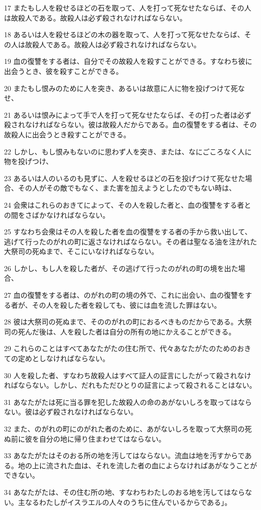 \par 17 またもし人を殺せるほどの石を取って、人を打って死なせたならば、その人は故殺人である。故殺人は必ず殺されなければならない。
\par 18 あるいは人を殺せるほどの木の器を取って、人を打って死なせたならば、その人は故殺人である。故殺人は必ず殺されなければならない。
\par 19 血の復讐をする者は、自分でその故殺人を殺すことができる。すなわち彼に出会うとき、彼を殺すことができる。
\par 20 またもし恨みのために人を突き、あるいは故意に人に物を投げつけて死なせ、
\par 21 あるいは恨みによって手で人を打って死なせたならば、その打った者は必ず殺されなければならない。彼は故殺人だからである。血の復讐をする者は、その故殺人に出会うとき殺すことができる。
\par 22 しかし、もし恨みもないのに思わず人を突き、または、なにごころなく人に物を投げつけ、
\par 23 あるいは人のいるのも見ずに、人を殺せるほどの石を投げつけて死なせた場合、その人がその敵でもなく、また害を加えようとしたのでもない時は、
\par 24 会衆はこれらのおきてによって、その人を殺した者と、血の復讐をする者との間をさばかなければならない。
\par 25 すなわち会衆はその人を殺した者を血の復讐をする者の手から救い出して、逃げて行ったのがれの町に返さなければならない。その者は聖なる油を注がれた大祭司の死ぬまで、そこにいなければならない。
\par 26 しかし、もし人を殺した者が、その逃げて行ったのがれの町の境を出た場合、
\par 27 血の復讐をする者は、のがれの町の境の外で、これに出会い、血の復讐をする者が、その人を殺した者を殺しても、彼には血を流した罪はない。
\par 28 彼は大祭司の死ぬまで、そののがれの町におるべきものだからである。大祭司の死んだ後は、人を殺した者は自分の所有の地にかえることができる。
\par 29 これらのことはすべてあなたがたの住む所で、代々あなたがたのためのおきての定めとしなければならない。
\par 30 人を殺した者、すなわち故殺人はすべて証人の証言にしたがって殺されなければならない。しかし、だれもただひとりの証言によって殺されることはない。
\par 31 あなたがたは死に当る罪を犯した故殺人の命のあがないしろを取ってはならない。彼は必ず殺されなければならない。
\par 32 また、のがれの町にのがれた者のために、あがないしろを取って大祭司の死ぬ前に彼を自分の地に帰り住まわせてはならない。
\par 33 あなたがたはそのおる所の地を汚してはならない。流血は地を汚すからである。地の上に流された血は、それを流した者の血によらなければあがなうことができない。
\par 34 あなたがたは、その住む所の地、すなわちわたしのおる地を汚してはならない。主なるわたしがイスラエルの人々のうちに住んでいるからである」。

